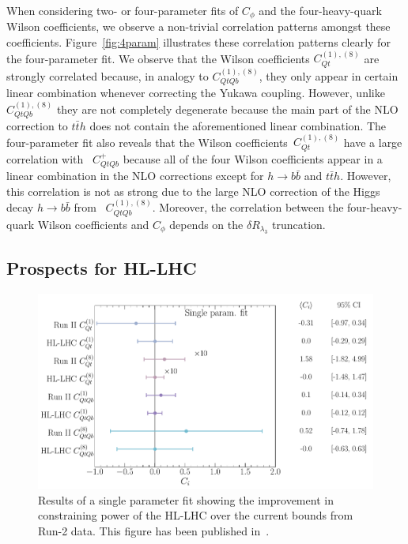 %
When considering two- or four-parameter fits of $C_\phi$ and the four-heavy-quark Wilson coefficients, we observe a non-trivial correlation patterns amongst these coefficients.  Figure~\ref{fig:4param} illustrates these correlation patterns clearly for the four-parameter fit. 
We observe that the Wilson coefficients $C_{Qt}^{(1),(8) }$ are strongly correlated because, in analogy to $C_{QtQb}^{(1),(8) }$, they only appear in certain linear combination whenever correcting the Yukawa coupling. However,  unlike $C_{QtQb}^{(1),(8) }$ they are not completely degenerate because the main part of the NLO correction to $t\bar t h$ does not contain the aforementioned linear combination.  The four-parameter fit also reveals that the Wilson coefficients~$C_{Qt}^{(1),(8) }$ have a large correlation with ~$C_{QtQb}^{+}$ because all of the four Wilson coefficients appear in a linear combination in the NLO corrections except for $ h\to b\bar b$ and $ t\bar{t} h$. However, this correlation is not as strong due to the large NLO correction of the Higgs decay $h \to b \bar b$ from ~$C_{QtQb}^{(1),(8) }$. Moreover, the correlation between the four-heavy-quark Wilson coefficients  and $C_{\phi}$ depends on the $\delta R_{\lambda_3}$ truncation. 

\subsection{Prospects for HL-LHC}
\begin{figure}[t!]
	\begin{center}
		\includegraphics[width=0.75\linewidth]{fig/uebeblick_forest_ci}
	\end{center}
	\caption{ Results of a single parameter fit showing the improvement in constraining power of the HL-LHC over the current bounds from Run-2 data.  This figure has been published in~\cite{Alasfar:2022zyr}. \label{fig:HLLHC} }
\end{figure}

